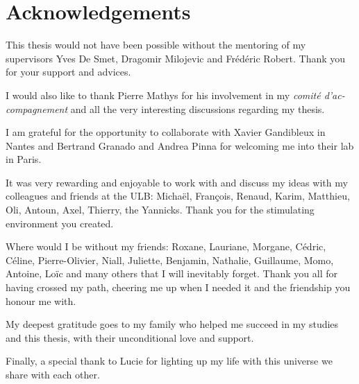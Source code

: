 \chapter{Acknowledgements}

This thesis would not have been possible without the mentoring of my supervisors Yves De Smet, Dragomir Milojevic and Frédéric Robert. Thank you for your support and advices.

I would also like to thank Pierre Mathys for his involvement in my \textit{comité d'ac-compagnement} and all the very interesting discussions regarding my thesis.

I am grateful for the opportunity to collaborate with Xavier Gandibleux in Nantes and Bertrand Granado and Andrea Pinna for welcoming me into their lab in Paris.

It was very rewarding and enjoyable to work with and discuss my ideas with my colleagues and friends at the ULB: Michaël, François, Renaud, Karim, Matthieu, Oli, Antoun, Axel, Thierry, the Yannicks. Thank you for the stimulating environment you created.

Where would I be without my friends: Roxane, Lauriane, Morgane, Cédric, Céline, Pierre-Olivier, Niall, Juliette, Benjamin, Nathalie, Guillaume, Momo, Antoine, Loïc and many others that I will inevitably forget. Thank you all for having crossed my path, cheering me up when I needed it and the friendship you honour me with.

My deepest gratitude goes to my family who helped me succeed in my studies and this thesis, with their unconditional love and support.

Finally, a special thank to Lucie for lighting up my life with this universe we share with each other.